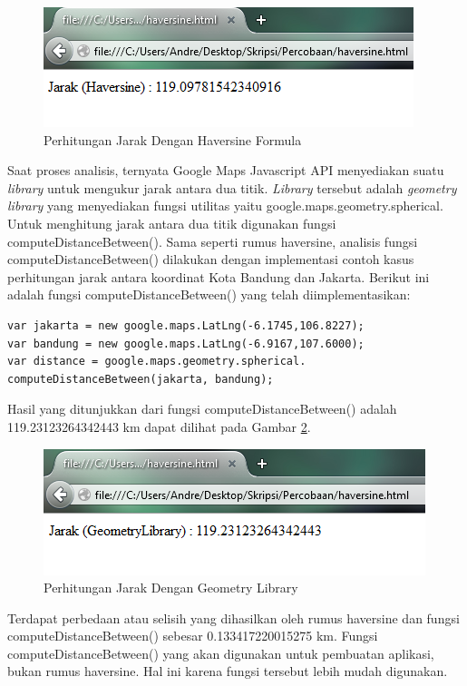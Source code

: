 \begin{figure}[h]
\centering
\includegraphics[scale=1]{Gambar/analisis_haver}
\caption[Perhitungan Jarak Dengan Haversine Formula]{Perhitungan Jarak Dengan Haversine Formula}
\label{fig:analisis_haver}
\end{figure}
Saat proses analisis, ternyata Google Maps Javascript API menyediakan suatu
\textit{library} untuk mengukur jarak antara dua titik. \textit{Library}
tersebut adalah \textit{geometry library} yang menyediakan fungsi utilitas yaitu
google.maps.geometry.spherical. Untuk menghitung jarak antara dua titik
digunakan fungsi computeDistanceBetween(). Sama seperti rumus haversine,
analisis fungsi computeDistanceBetween() dilakukan dengan implementasi contoh
kasus perhitungan jarak antara koordinat Kota Bandung dan Jakarta. Berikut ini
adalah fungsi computeDistanceBetween() yang telah diimplementasikan:
\begin{verbatim}
var jakarta = new google.maps.LatLng(-6.1745,106.8227);
var bandung = new google.maps.LatLng(-6.9167,107.6000);
var distance = google.maps.geometry.spherical.
computeDistanceBetween(jakarta, bandung);
\end{verbatim}
Hasil yang ditunjukkan dari fungsi computeDistanceBetween() adalah
119.23123264342443 km dapat dilihat pada Gambar \ref{fig:analisis_geometry}.

\begin{figure}[h]
\centering
\includegraphics[scale=1]{Gambar/analisis_geometry}
\caption[Perhitungan Jarak Dengan Geometry Library]{Perhitungan Jarak Dengan
Geometry Library}
\label{fig:analisis_geometry}
\end{figure}
Terdapat perbedaan atau selisih yang dihasilkan oleh rumus haversine dan
fungsi computeDistanceBetween() sebesar 0.133417220015275 km. Fungsi 
computeDistanceBetween() yang akan digunakan untuk pembuatan aplikasi, bukan
rumus haversine. Hal ini karena fungsi tersebut lebih mudah digunakan.


